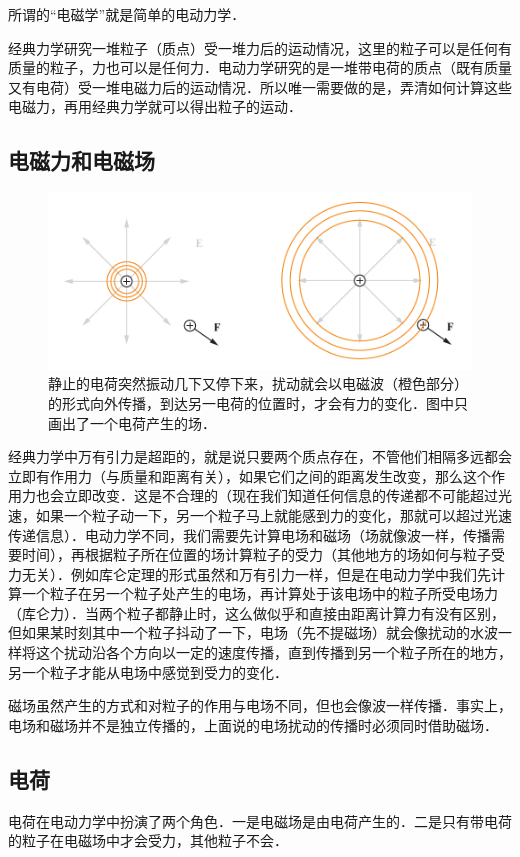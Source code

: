 所谓的“电磁学”就是简单的电动力学．

经典力学研究一堆粒子（质点）受一堆力后的运动情况，这里的粒子可以是任何有质量的粒子，力也可以是任何力．电动力学研究的是一堆带电荷的质点（既有质量又有电荷）受一堆电磁力后的运动情况．所以唯一需要做的是，弄清如何计算这些电磁力，再用经典力学就可以得出粒子的运动．

\subsection{电磁力和电磁场}

\begin{figure}[ht]
\centering
\includegraphics[width=14cm]{./figures/EM01.pdf}
\caption{静止的电荷突然振动几下又停下来，扰动就会以电磁波（橙色部分）的形式向外传播，到达另一电荷的位置时，才会有力的变化．图中只画出了一个电荷产生的场．} \label{EM0_fig1}
\end{figure}

经典力学中万有引力是超距的，就是说只要两个质点存在，不管他们相隔多远都会立即有作用力（与质量和距离有关），如果它们之间的距离发生改变，那么这个作用力也会立即改变．这是不合理的（现在我们知道任何信息的传递都不可能超过光速，如果一个粒子动一下，另一个粒子马上就能感到力的变化，那就可以超过光速传递信息）．电动力学不同，我们需要先计算电场和磁场（场就像波一样，传播需要时间），再根据粒子所在位置的场计算粒子的受力（其他地方的场如何与粒子受力无关）．例如库仑定理的形式虽然和万有引力一样，但是在电动力学中我们先计算一个粒子在另一个粒子处产生的电场，再计算处于该电场中的粒子所受电场力（库仑力）．当两个粒子都静止时，这么做似乎和直接由距离计算力有没有区别，但如果某时刻其中一个粒子抖动了一下，电场（先不提磁场）就会像扰动的水波一样将这个扰动沿各个方向以一定的速度传播，直到传播到另一个粒子所在的地方，另一个粒子才能从电场中感觉到受力的变化．

磁场虽然产生的方式和对粒子的作用与电场不同，但也会像波一样传播．事实上，电场和磁场并不是独立传播的，上面说的电场扰动的传播时必须同时借助磁场．

\subsection{电荷}
电荷在电动力学中扮演了两个角色．一是电磁场是由电荷产生的．二是只有带电荷的粒子在电磁场中才会受力，其他粒子不会．

